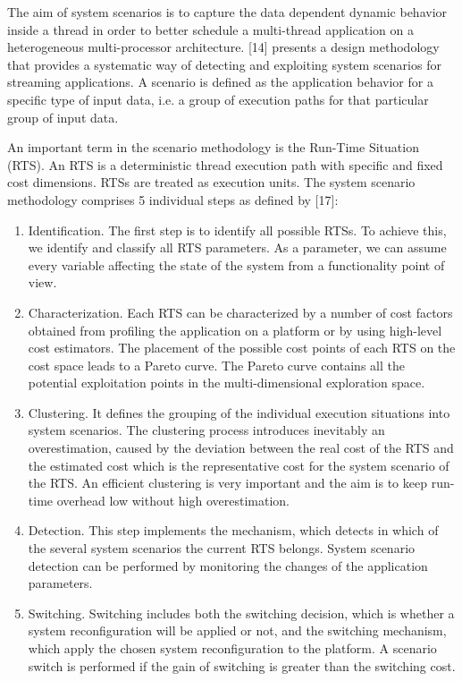 	The aim of system scenarios is to capture the data dependent dynamic behavior inside a thread in order to better schedule a multi-thread application on a heterogeneous multi-processor architecture. [14] presents a design methodology that provides a systematic way of detecting and exploiting system scenarios for streaming applications. A scenario is defined as the application behavior for a specific type of input data, i.e. a group of execution paths for that particular group of input data.

An important term in the scenario methodology is the Run-Time Situation (RTS). An RTS is a deterministic thread execution path with specific and fixed cost dimensions. RTSs are treated as execution units. The system scenario methodology comprises 5 individual steps as defined by [17]:
\begin{enumerate}
\item 	Identification. The first step is to identify all possible RTSs. To achieve this, we identify and classify all RTS parameters. As a parameter, we can assume every variable affecting the state of the system from a functionality point of view.
\item Characterization. Each RTS can be characterized by a number of cost factors obtained from profiling the application on a platform or by using high-level cost estimators. The placement of the possible cost points of each RTS on the cost space leads to a Pareto curve. The Pareto curve contains all the potential exploitation points in the multi-dimensional exploration space.
\item Clustering. It defines the grouping of the individual execution situations into system scenarios. The clustering process introduces inevitably an overestimation, caused by the deviation between the real cost of the RTS and the estimated cost which is the representative cost for the system scenario of the RTS. An efficient clustering is very important and the aim is to keep run-time overhead low without high overestimation. 
\item Detection. This step implements the mechanism, which detects in which of the several system scenarios the current RTS belongs. System scenario detection can be performed by monitoring the changes of the application parameters.
\item Switching. Switching includes both the switching decision, which is whether a system reconfiguration will be applied or not, and the switching mechanism, which apply the chosen system reconfiguration to the platform. A scenario switch is performed if the gain of switching is greater than the switching cost. 
\end{enumerate}

